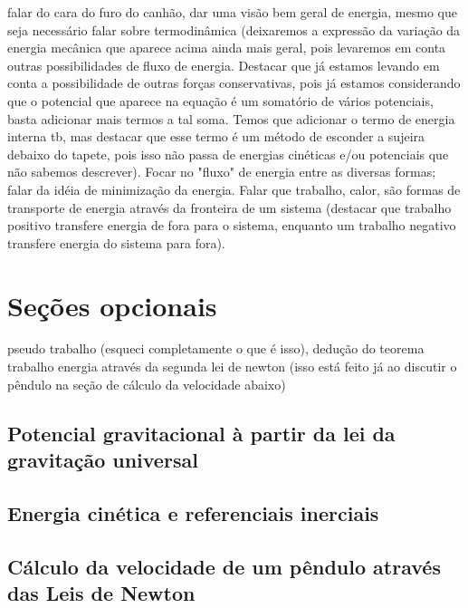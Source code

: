 falar do cara do furo do canhão, dar uma visão bem geral de energia, mesmo que seja necessário falar sobre termodinâmica (deixaremos a expressão da variação da energia mecânica que aparece acima ainda mais geral, pois levaremos em conta outras possibilidades de fluxo de energia. Destacar que já estamos levando em conta a possibilidade de outras forças conservativas, pois já estamos considerando que o potencial que aparece na equação é um somatório de vários potenciais, basta adicionar mais termos a tal soma. Temos que adicionar o termo de energia interna tb, mas destacar que esse termo é um método de esconder a sujeira debaixo do tapete, pois isso não passa de energias cinéticas e/ou potenciais que não sabemos descrever). Focar no "fluxo" de energia entre as diversas formas; falar da idéia de minimização da energia. Falar que trabalho, calor, são formas de transporte de energia através da fronteira de um sistema (destacar que trabalho positivo transfere energia de fora para o sistema, enquanto um trabalho negativo transfere energia do sistema para fora).

\section{Seções opcionais}

pseudo trabalho (esqueci completamente o que é isso), dedução do teorema trabalho energia através da segunda lei de newton (isso está feito já ao discutir o pêndulo na seção de cálculo da velocidade abaixo)

\subsection{Potencial gravitacional à partir da lei da gravitação universal}

\subsection{Energia cinética e referenciais inerciais}

\subsection{Cálculo da velocidade de um pêndulo através das Leis de Newton}

